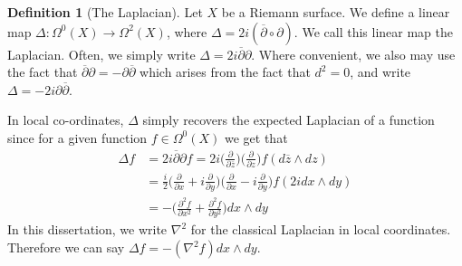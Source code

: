 \documentclass[11pt]{report}
\theoremstyle{definition}
\newtheorem{defn}[thm]{Definition}
\begin{document}
\begin{defn}[The Laplacian]\label{LaplacianDef}
  Let $X$ be a Riemann surface. We define a linear map $\Delta:\Omega^0(X)\rightarrow \Omega^2(X)$, where $\Delta=2i(\overline{\partial}\circ \partial)$. We call this linear map the Laplacian. Often, we simply write $\Delta=2i\overline{\partial}\partial$. Where convenient, we also may use the fact that $\overline{\partial}\partial = -\partial\overline{\partial}$ which arises from the fact that $d^2 = 0$, and write $\Delta = -2i\partial\overline{\partial}$.
\end{defn}
In local co-ordinates, $\Delta$ simply recovers the expected Laplacian of a function since for a given function $f\in \Omega^0(X)$ we get that 
\begin{align*}
  \Delta f &= 2i\overline{\partial }\partial f = 2i\Big(\frac{\partial}{\partial\overline{z}}\Big)\Big(\frac{\partial}{\partial z}\Big)f(d\overline{z}\wedge dz) \\
  &=\frac{i}{2}\Big(\frac{\partial}{\partial x} + i\frac{\partial}{\partial y}\Big)\Big(\frac{\partial}{\partial x} - i\frac{\partial}{\partial y}\Big)f(2idx\wedge dy) \\
  &= -\Big(\frac{\partial^2 f}{\partial x^2} + \frac{\partial^2 f}{\partial y^2}\Big)dx\wedge dy 
\end{align*}
In this dissertation, we write $\nabla^2$ for the classical Laplacian in local coordinates. Therefore we can say $\Delta f = -(\nabla^2 f) dx\wedge dy$.
\end{document}
